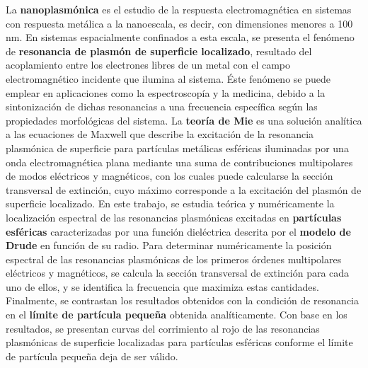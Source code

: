 \documentclass[a0paper,portrait]{baposter}
\begin{document}
\begin{poster}
{\begin{singlespace}
				La {\color{mxpink}\textbf{nanoplasmónica}} es el estudio de la respuesta electromagnética en sistemas con respuesta metálica a la nanoescala, es decir, con dimensiones menores a 100 nm. En sistemas espacialmente confinados a esta escala, se presenta el fenómeno de {\color{mxpink}\textbf{resonancia de plasmón de superficie localizado}}, resultado del acoplamiento entre los electrones libres de un metal con el campo electromagnético incidente que ilumina al sistema. Éste fenómeno se puede emplear en aplicaciones como la espectroscopía y la medicina, debido a la sintonización de dichas resonancias a una frecuencia específica según las propiedades morfológicas del sistema. La {\color{mxpink}\textbf{teoría de Mie}} es una solución analítica a las ecuaciones de Maxwell que describe la excitación de la resonancia plasmónica de superficie para partículas metálicas esféricas iluminadas por una onda electromagnética plana mediante una suma de contribuciones multipolares de modos eléctricos y magnéticos, con los cuales puede calcularse la sección transversal de extinción, cuyo máximo corresponde a la excitación del plasmón de superficie localizado. En este trabajo, se estudia teórica y numéricamente la localización espectral de las resonancias plasmónicas excitadas en {\color{mxpink}\textbf{partículas esféricas}} caracterizadas por una función dieléctrica descrita por el {\color{mxpink}\textbf{modelo de Drude}} en función de su radio. Para determinar numéricamente la posición espectral de las resonancias plasmónicas de los primeros órdenes multipolares eléctricos y magnéticos, se calcula la sección transversal de extinción para cada uno de ellos, y se identifica la frecuencia que maximiza estas cantidades. Finalmente, se contrastan los resultados obtenidos con la condición de resonancia en el {\color{mxpink}\textbf{límite de partícula pequeña}} obtenida analíticamente. Con base en los resultados, se presentan curvas del corrimiento al rojo de las resonancias plasmónicas de superficie localizadas para partículas esféricas conforme el límite de partícula pequeña deja de ser válido.
			\end{singlespace}
			
		}
		
		
		
\end{poster}
\end{document}
